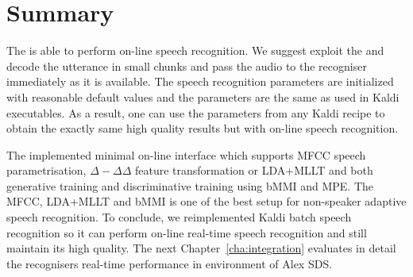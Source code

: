 \section{Summary}
\label{sec:dec_sum}
The  is able to perform on-line speech recognition.
We suggest exploit the  and decode the utterance in small chunks and pass the audio to the recogniser immediately as it is available.
The speech recognition parameters are initialized with reasonable default values and the parameters are the same as used in Kaldi executables. 
As a result, one can use the parameters from any Kaldi recipe to obtain the exactly same high quality results but with on-line speech recognition.

The implemented minimal on-line interface which supports \ac{MFCC} speech parametrisation, $\Delta-\Delta\Delta$ feature transformation or \ac{LDA}+\ac{MLLT} and both generative training and discriminative training using \ac{bMMI} and \ac{MPE}.
The \ac{MFCC}, \ac{LDA}+\ac{MLLT} and \ac{bMMI} is one of the best setup for non-speaker adaptive speech recognition.
To conclude, we reimplemented Kaldi batch speech recognition so it can perform on-line real-time speech recognition and still maintain its high quality.
The next Chapter~\ref{cha:integration} evaluates in detail the recognisers real-time performance in environment of Alex \ac{SDS}.
